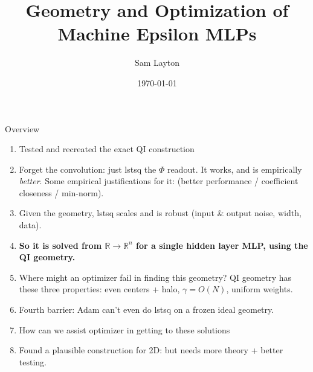 \documentclass[aspectratio=169,10pt]{beamer}
\title{Geometry and Optimization of Machine Epsilon MLPs}
\author{Sam Layton}
\date{\today}
\newcommand{\slidetag}{}
\newcommand{\settag}[1]{\renewcommand{\slidetag}{#1}}
\begin{document}
\maketitle
\settag{}

\begin{frame}{Overview}
  \small
  \begin{enumerate}
    \item Tested and recreated the exact QI construction
    \item Forget the convolution: just \alert{lstsq the $\Phi$ readout}. It
          works, and is empirically \emph{better}. Some empirical justifications for it:
          (better performance / coefficient closeness / min-norm).
    \item Given the geometry, lstsq \alert{scales and is robust} (input \&
          output noise, width, data).
    \item[$\Rightarrow$] \textbf{So it is solved from $\mathbb{R} \rightarrow \mathbb{R}^n$ for a single hidden layer MLP, using the QI geometry.}
    \item Where might an optimizer fail in finding this geometry? QI geometry has these \alert{three properties}: even centers + halo, $\gamma=O(N)$, uniform weights.
    \item Fourth barrier: Adam can't even do lstsq on a frozen ideal geometry.
    \item How can we assist optimizer in getting to these solutions
    \item Found a plausible construction for 2D: but needs more theory + better testing.
  \end{enumerate}
\end{frame}

\end{document}
